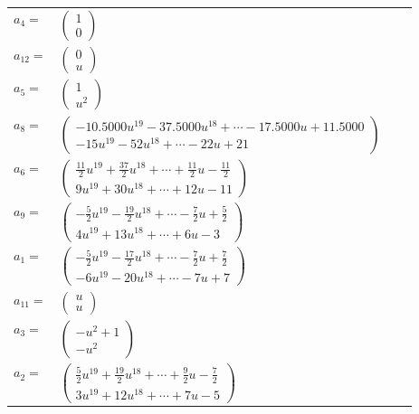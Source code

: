 \documentclass[1p]{elsarticle_modified}
\theoremstyle{definition}
\begin{document}
\begin{tabular}{m{7pt} m{180pt} m{7pt} m{180pt} }
\flushright $a_{4}=$&$\begin{pmatrix}1\\0\end{pmatrix}$ \\
\flushright $a_{12}=$&$\begin{pmatrix}0\\u\end{pmatrix}$ \\
\flushright $a_{5}=$&$\begin{pmatrix}1\\u^2\end{pmatrix}$ \\
\flushright $a_{8}=$&$\begin{pmatrix}-10.5000 u^{19}-37.5000 u^{18}+\cdots-17.5000 u+11.5000\\-15 u^{19}-52 u^{18}+\cdots-22 u+21\end{pmatrix}$ \\
\flushright $a_{6}=$&$\begin{pmatrix}\frac{11}{2} u^{19}+\frac{37}{2} u^{18}+\cdots+\frac{11}{2} u-\frac{11}{2}\\9 u^{19}+30 u^{18}+\cdots+12 u-11\end{pmatrix}$ \\
\flushright $a_{9}=$&$\begin{pmatrix}-\frac{5}{2} u^{19}-\frac{19}{2} u^{18}+\cdots-\frac{7}{2} u+\frac{5}{2}\\4 u^{19}+13 u^{18}+\cdots+6 u-3\end{pmatrix}$ \\
\flushright $a_{1}=$&$\begin{pmatrix}-\frac{5}{2} u^{19}-\frac{17}{2} u^{18}+\cdots-\frac{7}{2} u+\frac{7}{2}\\-6 u^{19}-20 u^{18}+\cdots-7 u+7\end{pmatrix}$ \\
\flushright $a_{11}=$&$\begin{pmatrix}u\\u\end{pmatrix}$ \\
\flushright $a_{3}=$&$\begin{pmatrix}- u^2+1\\- u^2\end{pmatrix}$ \\
\flushright $a_{2}=$&$\begin{pmatrix}\frac{5}{2} u^{19}+\frac{19}{2} u^{18}+\cdots+\frac{9}{2} u-\frac{7}{2}\\3 u^{19}+12 u^{18}+\cdots+7 u-5\end{pmatrix}$ \\

\end{tabular}
\end{document}
